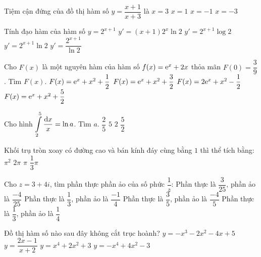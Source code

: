 \begin{ex}%
Tiệm cận đứng của đồ thị hàm số $y=\dfrac{x+1}{x+3}$ là
\choice
{$x=3$}
{$x=1$}
{$x=-1$}
{\True $x=-3$}

\end{ex}
\begin{ex}%
Tính đạo hàm của hàm số $y=2^{x+1}$ 
\choice
{$y'=(x+1) 2^{x} \ln 2$}
{$y'=2^{x+1} \log 2$}
{\True $y'=2^{x+1} \ln 2$}
{$y'=\dfrac{2^{x+1}}{\ln 2}$}

\end{ex}
\begin{ex}%
Cho $F(x)$ là một nguyên hàm của hàm số $f(x)={\rm e}^{x}+2 x$ thỏa mãn $F(0)=\dfrac{3}{9}$. Tìm $F(x)$.
\choice
{\True $F(x)={\rm e}^{x}+x^2+\dfrac{1}{2}$}
{$F(x)={\rm e}^{x}+x^2+\dfrac{3}{2}$}
{$F(x)=2 {\rm e}^{x}+x^2-\dfrac{1}{2}$}
{$F(x)={\rm e}^{x}+x^2+\dfrac{5}{2}$}

\end{ex}
\begin{ex}%
Cho hình $\displaystyle\displaystyle\int\limits_2^5 \dfrac{\mathrm{d} x}{x}=\ln a$. Tìm $a$.
\choice
{$\dfrac{2}{5}$}
{$5$}
{$2$}
{\True $\dfrac{5}{2}$}

\end{ex}
\begin{ex}%
Khối trụ tròn xoay có đường cao và bán kính đáy cùng bằng $1$ thì thể tích bằng:
\choice
{$\pi^2$}
{$2\pi$}
{\True $\pi$}
{$\dfrac{1}{3} \pi$}

\end{ex}
\begin{ex}%
Cho $z=3+4 i$, tìm phần thực phần ảo của số phức $\dfrac{1}{z}$:
\choice
{\True Phần thực là $\dfrac{3}{25}$, phần ảo là $\dfrac{-4}{25}$}
{Phần thực là $\dfrac{1}{3}$, phần ảo là $\dfrac{-1}{4}$}
{Phần thực là $\dfrac{3}{5}$, phần ảo là $\dfrac{-4}{5}$}
{Phần thực là $\dfrac{1}{3}$, phần ảo là $\dfrac{1}{4}$}

\end{ex}
\begin{ex}%
Đồ thị hàm số nào sau đây không cắt trục hoành?
\choice
{$y=-x^3-2 x^2-4 x+5$}
{$y=\dfrac{2 x-1}{x+2}$}
{\True $y=x^4+2 x^2+3$}
{$y=-x^4+4 x^2-3$}

\end{ex}
